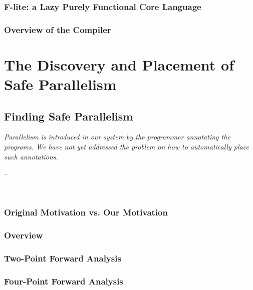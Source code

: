 \documentclass[openright, dottedtoc, headinclude, footinclude=true, a4paper, numbers=noenddot]{scrreprt}
\makeatletter
\newenvironment{chapquote}[2][2em]
  {\setlength{\@tempdima}{#1}%
   \def\chapquote@author{#2}%
   \parshape 1 \@tempdima \dimexpr\textwidth-2\@tempdima\relax%
   \itshape}
  {\par\normalfont\hfill--\ \chapquote@author\hspace*{\@tempdima}\par\noindent\hrulefill\\[1cm]}
\makeatother
\begin{document}
        \section{F-lite: a Lazy Purely Functional Core Language}
        \label{sec:Flite}
        
        
        \section{Overview of the Compiler}
        \label{sec:overview}
        

\part{The Discovery and Placement of Safe Parallelism}
\label{part:static}

    \chapter{Finding Safe Parallelism}
    \label{chap:discovery} 
    \begin{chapquote}{\cite{vGMachine}}
    Parallelism is introduced in our system by the programmer annotating the
    programs. We have not yet addressed the problem on how to automatically
    place such annotations.
    \end{chapquote}
    

        \section{Original Motivation vs. Our Motivation}
        
    
        \section{Overview}
        \label{sec:strictnessOverview}
        
    
        \section{Two-Point Forward Analysis}
        \label{sec:twoPoint}
        
    
        \section{Four-Point Forward Analysis}
        \label{sec:fourPoint}
        
    
\end{document}
